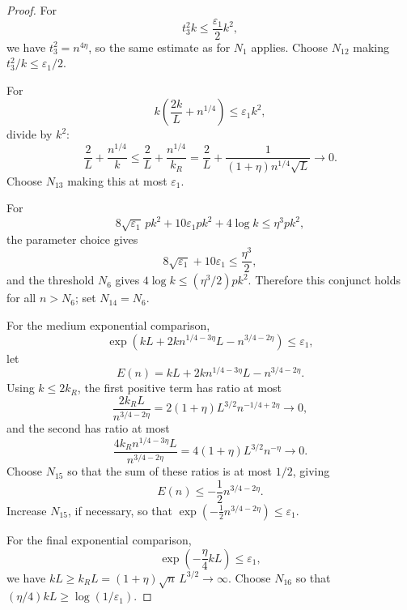 \begin{proof}
For
\[
t_3^2k\le \frac{\varepsilon_1}{2}k^2,
\]
we have \(t_3^2=n^{4\eta}\), so the same estimate as for \(N_1\) applies.
Choose \(N_{12}\) making \(t_3^2/k\le\varepsilon_1/2\).

For
\[
k\left(\frac{2k}{L}+n^{1/4}\right)\le\varepsilon_1k^2,
\]
divide by \(k^2\):
\[
\frac{2}{L}+\frac{n^{1/4}}{k}
\le
\frac2L+\frac{n^{1/4}}{k_R}
=\frac2L+\frac{1}{(1+\eta)n^{1/4}\sqrt L}\to0.
\]
Choose \(N_{13}\) making this at most \(\varepsilon_1\).

For
\[
8\sqrt{\varepsilon_1}\,pk^2+10\varepsilon_1pk^2+4\log k
  \le \eta^3pk^2,
\]
the parameter choice gives
\[
8\sqrt{\varepsilon_1}+10\varepsilon_1\le\frac{\eta^3}{2},
\]
and the threshold \(N_6\) gives \(4\log k\le(\eta^3/2)pk^2\).  Therefore this
conjunct holds for all \(n>N_6\); set \(N_{14}=N_6\).

For the medium exponential comparison,
\[
\exp\!\left(kL+2kn^{1/4-3\eta}L-n^{3/4-2\eta}\right)\le\varepsilon_1,
\]
let
\[
E(n)=kL+2kn^{1/4-3\eta}L-n^{3/4-2\eta}.
\]
Using \(k\le2k_R\), the first positive term has ratio at most
\[
\frac{2k_RL}{n^{3/4-2\eta}}
=2(1+\eta)L^{3/2}n^{-1/4+2\eta}\to0,
\]
and the second has ratio at most
\[
\frac{4k_Rn^{1/4-3\eta}L}{n^{3/4-2\eta}}
=4(1+\eta)L^{3/2}n^{-\eta}\to0.
\]
Choose \(N_{15}\) so that the sum of these ratios is at most \(1/2\), giving
\[
E(n)\le-\frac12 n^{3/4-2\eta}.
\]
Increase \(N_{15}\), if necessary, so that
\(\exp(-\frac12 n^{3/4-2\eta})\le\varepsilon_1\).

For the final exponential comparison,
\[
\exp\!\left(-\frac{\eta}{4}kL\right)\le\varepsilon_1,
\]
we have \(kL\ge k_RL=(1+\eta)\sqrt n\,L^{3/2}\to\infty\).  Choose \(N_{16}\)
so that \((\eta/4)kL\ge\log(1/\varepsilon_1)\).


\end{proof}

